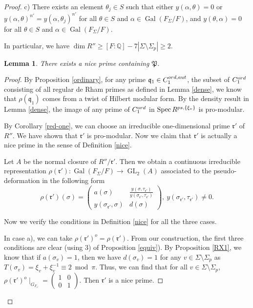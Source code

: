 \documentclass[12pt]{amsart}
\theoremstyle{plain}
\newtheorem{lem}[thm]{Lemma}
\theoremstyle{definition}
\theoremstyle{remark}
\begin{document}
\begin{proof}
	 c) There exists an element $\theta_{j} \in S$ such that either $y(\alpha, \theta)=0$ or $y(\alpha, \theta)^{n'}=y(\alpha, \theta_j)^{n'}$ for all $\theta \in S$ and $\alpha \in \operatorname{Gal}(F_\Sigma/F)$, and $y(\theta, \alpha) = 0 $ for all $\theta \in S$ and $\alpha \in \operatorname{Gal}(F_\Sigma/F)$.
	 
	 In particular, we have $\operatorname{dim} R'' \ge [F: \mathbb{Q}]-7|\Sigma \setminus \Sigma_p| \ge 2$.
	 
	\begin{lem}
		There exists a nice prime containing $\mathfrak{P}$.
	\end{lem}
	
	\begin{proof}
		By Proposition \ref{ordinary}, for any prime $\mathfrak{q}_1 \in  C_1^{\textnormal{ord,aut}}$, the subset of $C_1^{\textnormal{ord}} $ consisting of all regular de Rham primes as defined in Lemma \ref{dense}, we know that $\rho(\mathfrak{q}_1)$ comes from a twist of Hilbert modular form. By the density result in Lemma \ref{dense}, the image of any prime of $C_1^{\textnormal{ord}}$ in $\operatorname{Spec} R^{\textnormal{ps},\{\xi_v\}}$ is pro-modular.  
		
		By Corollary \ref{red-one}, we can choose an irreducible one-dimensional prime $\mathfrak{r}'$ of $R''$. We have shown that $\mathfrak{r}' $ is pro-modular. Now we claim that $\mathfrak{r}' $ is actually a nice prime in the sense of Definition \ref{nice}.
		
		Let $A$ be the normal closure of $R''/\mathfrak{r}'$. Then we obtain a continuous irreducible representation $\rho(\mathfrak{r}') : \operatorname{Gal}(F_{\Sigma}/F) \to \operatorname{GL}_2(A)$ associated to the pseudo-deformation in the following form $$
		\rho(\mathfrak{r}')(\sigma)=\begin{pmatrix}
			a(\sigma) & \frac{y(\sigma, \tau_{\mathfrak{r}'})}{y(\sigma_{\mathfrak{r}'}, \tau_{\mathfrak{r}'})}\\
			y(\sigma_{\mathfrak{r}'}, \sigma)& d(\sigma)
	\end{pmatrix}, ~y(\sigma_{\mathfrak{r}'}, \tau_{\mathfrak{r}'}) \ne 0.$$
		
		Now we verify the conditions in Definition \ref{nice} for all the three cases. 
		
		In case a), we can take $\rho(\mathfrak{r}')^o=\rho(\mathfrak{r}')$. From our construction, the first three conditions are clear (using 3) of Proposition \ref{equiv}). By Proposition \ref{RX1}, we know that if $a(\sigma_{v})=1$, then we have $d(\sigma_{v})=1$ for any $v \in \Sigma \setminus \Sigma_p$ as $T(\sigma_{v})=\xi_v+\xi_v^{-1} \equiv 2~ \operatorname{mod}~\pi$. Thus, we can find that for all $v \in \Sigma \setminus \Sigma_p$, $\rho(\mathfrak{r}')^o \mid_{G_{F_v}}= \begin{pmatrix}
			1 & 0\\
			0 & 1
		\end{pmatrix}$. Then $\mathfrak{r}' $ is a nice prime.
		

\end{proof}
\end{proof}
\end{document}
